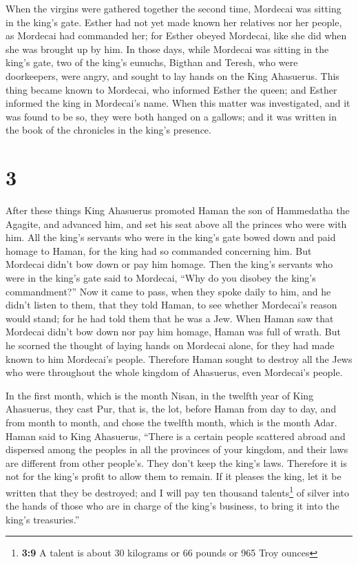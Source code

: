  When the virgins were gathered together the second time,
Mordecai was sitting in the king's gate.  Esther had not
yet made known her relatives nor her people, as Mordecai had commanded
her; for Esther obeyed Mordecai, like she did when she was brought up by
him.  In those days, while Mordecai was sitting in the
king's gate, two of the king's eunuchs, Bigthan and Teresh, who were
doorkeepers, were angry, and sought to lay hands on the King Ahasuerus.
 This thing became known to Mordecai, who informed Esther
the queen; and Esther informed the king in Mordecai's name.
 When this matter was investigated, and it was found to
be so, they were both hanged on a gallows; and it was written in the
book of the chronicles in the king's presence.

\hypertarget{section-2}{%
\section{3}\label{section-2}}

 After these things King Ahasuerus promoted Haman the son
of Hammedatha the Agagite, and advanced him, and set his seat above all
the princes who were with him.  All the king's servants
who were in the king's gate bowed down and paid homage to Haman, for the
king had so commanded concerning him. But Mordecai didn't bow down or
pay him homage.  Then the king's servants who were in the
king's gate said to Mordecai, ``Why do you disobey the king's
commandment?''  Now it came to pass, when they spoke daily
to him, and he didn't listen to them, that they told Haman, to see
whether Mordecai's reason would stand; for he had told them that he was
a Jew.  When Haman saw that Mordecai didn't bow down nor
pay him homage, Haman was full of wrath.  But he scorned
the thought of laying hands on Mordecai alone, for they had made known
to him Mordecai's people. Therefore Haman sought to destroy all the Jews
who were throughout the whole kingdom of Ahasuerus, even Mordecai's
people.

 In the first month, which is the month Nisan, in the
twelfth year of King Ahasuerus, they cast Pur, that is, the lot, before
Haman from day to day, and from month to month, and chose the twelfth
month, which is the month Adar.  Haman said to King
Ahasuerus, ``There is a certain people scattered abroad and dispersed
among the peoples in all the provinces of your kingdom, and their laws
are different from other people's. They don't keep the king's laws.
Therefore it is not for the king's profit to allow them to remain.
 If it pleases the king, let it be written that they be
destroyed; and I will pay ten thousand talents\footnote{\textbf{3:9} A
  talent is about 30 kilograms or 66 pounds or 965 Troy ounces} of
silver into the hands of those who are in charge of the king's business,
to bring it into the king's treasuries.''

